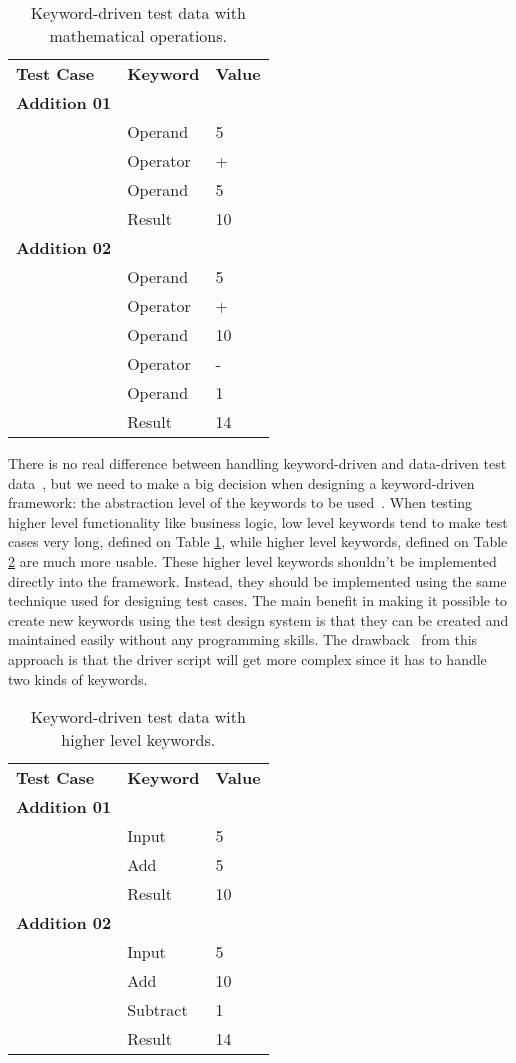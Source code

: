 \begin{table}[!ht]
\centering
\begin{tabular}{lll}
\textbf{Test Case} & \textbf{Keyword} & \textbf{Value} \\
\textbf{Addition 01} & & \\
& Operand & 5 \\
& Operator & + \\
& Operand & 5 \\
& Result & 10 \\
\textbf{Addition 02}  & & \\
& Operand & 5 \\
& Operator & + \\
& Operand & 10 \\
& Operator & - \\
& Operand & 1 \\
& Result & 14 \\
\end{tabular}
\caption{Keyword-driven test data with mathematical operations.}
\label{table:tab2}
\end{table}

\noindent There is no real difference between handling keyword-driven and data-driven test
data~\cite{Fewster99,Lau07}, but we need to make a big decision when designing a keyword-driven framework:
the abstraction level of the keywords to be used~\cite{Lau07}. When testing higher level
functionality like business logic, low level keywords tend to make test cases
very long, defined on Table \ref{table:tab2}, while higher level keywords, defined
on Table \ref{table:tab3} are much more usable. These higher level keywords shouldn't
be implemented directly into the framework. Instead, they should be implemented
using the same technique used for designing test cases. The main benefit in
making it possible to create new keywords using the test design system is that
they can be created and maintained easily without any programming skills. The
drawback~\cite{Lau07} from this approach is that the driver script will get more
complex since it has to handle two kinds of keywords.

\begin{table}[!ht]
\centering
\begin{tabular}{lll}
\textbf{Test Case} & \textbf{Keyword} & \textbf{Value} \\
\textbf{Addition 01} & & \\
& Input & 5 \\
& Add & 5 \\
& Result & 10 \\
\textbf{Addition 02} & & \\
& Input & 5 \\
& Add & 10 \\
& Subtract & 1 \\
& Result & 14 \\
\end{tabular}
\caption{Keyword-driven test data with higher level keywords.}
\label{table:tab3}
\end{table}

